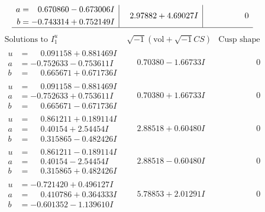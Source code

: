 \documentclass[1p]{elsarticle_modified}
\theoremstyle{definition}
\newcommand{\I}{\sqrt{-1}}
\begin{document}
$$\begin{array}{c|c|c}
\begin{aligned}
a &= \phantom{-}0.670860 - 0.673006 I \\
b &= -0.743314 + 0.752149 I\end{aligned}
 & \phantom{-}2.97882 + 4.69027 I & \phantom{-0.000000 } 0\\
 \hline 
 \end{array}$$\newpage$$\begin{array}{c|c|c}  
\text{Solutions to }I^u_{1}& \I (\text{vol} + \sqrt{-1}CS) & \text{Cusp shape}\\
 \hline 
\begin{aligned}
u &= \phantom{-}0.091158 + 0.881469 I \\
a &= -0.752633 - 0.753611 I \\
b &= \phantom{-}0.665671 + 0.671736 I\end{aligned}
 & \phantom{-}0.70380 - 1.66733 I & \phantom{-0.000000 } 0 \\ \hline\begin{aligned}
u &= \phantom{-}0.091158 - 0.881469 I \\
a &= -0.752633 + 0.753611 I \\
b &= \phantom{-}0.665671 - 0.671736 I\end{aligned}
 & \phantom{-}0.70380 + 1.66733 I & \phantom{-0.000000 } 0 \\ \hline\begin{aligned}
u &= \phantom{-}0.861211 + 0.189114 I \\
a &= \phantom{-}0.40154 + 2.54454 I \\
b &= \phantom{-}0.315865 - 0.482426 I\end{aligned}
 & \phantom{-}2.88518 + 0.60480 I & \phantom{-0.000000 } 0 \\ \hline\begin{aligned}
u &= \phantom{-}0.861211 - 0.189114 I \\
a &= \phantom{-}0.40154 - 2.54454 I \\
b &= \phantom{-}0.315865 + 0.482426 I\end{aligned}
 & \phantom{-}2.88518 - 0.60480 I & \phantom{-0.000000 } 0 \\ \hline\begin{aligned}
u &= -0.721420 + 0.496127 I \\
a &= \phantom{-}0.410786 + 0.364333 I \\
b &= -0.601352 - 1.139610 I\end{aligned}
 & \phantom{-}5.78853 + 2.01291 I & \phantom{-0.000000 } 0 \\ \hline\begin{aligned}

\end{aligned}
\end{array}$$
\end{document}

